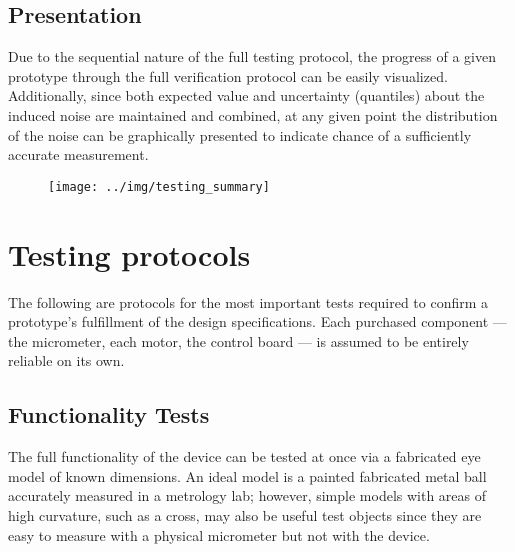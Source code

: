 \documentclass{article}
\begin{document}
\subsection{Presentation}
\label{sec:presentation}

Due to the sequential nature of the full testing protocol, the progress of a given prototype through the full verification protocol can be easily visualized. Additionally, since both expected value and uncertainty (quantiles) about the induced noise are maintained and combined, at any given point the distribution of the noise can be graphically presented to indicate chance of a sufficiently accurate measurement.

\begin{figure}[H]
  \centering
  \texttt{[image: ../img/testing\_summary]}
  \label{fig:summary}
\end{figure}

\section{Testing protocols}
\label{sec:protocols}

The following are protocols for the most important tests required to confirm a prototype's fulfillment of the design specifications. Each purchased component --- the micrometer, each motor, the control board --- is assumed to be entirely reliable on its own. 

\subsection{Functionality Tests}
\label{sec:functional-tests}

The full functionality of the device can be tested at once via a fabricated eye model of known dimensions. An ideal model is a painted fabricated metal ball accurately measured in a metrology lab; however, simple models with areas of high curvature, such as a cross, may also be useful test objects since they are easy to measure with a physical micrometer but not with the device. 
\end{document}
